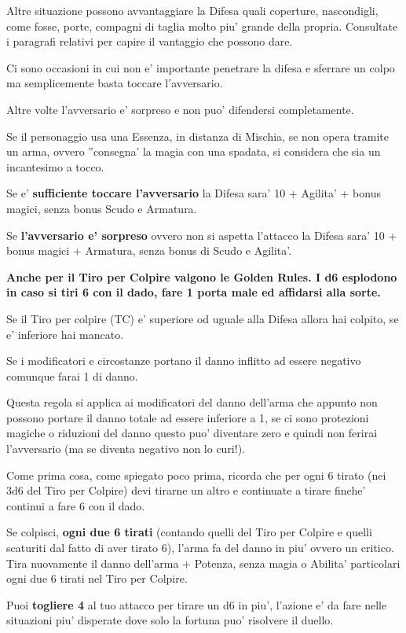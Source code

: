 \documentclass[a4paper,11pt,twoside,openany]{book}
\begin{document}
Altre situazione possono avvantaggiare la Difesa quali coperture, nascondigli, come fosse, porte, compagni di taglia molto piu' grande della propria. Consultate i paragrafi relativi per capire il vantaggio che possono dare.

Ci sono occasioni in cui non e' importante penetrare la difesa e sferrare un colpo ma semplicemente basta toccare l'avversario.

Altre volte l'avversario e' sorpreso e non puo' difendersi completamente.

Se il personaggio usa una Essenza, in distanza di Mischia, se non opera tramite un arma, ovvero ''consegna' la magia con una spadata, si considera che sia un incantesimo a tocco.

Se e' \textbf{sufficiente toccare l'avversario} la Difesa sara' 10 + Agilita' + bonus magici, senza bonus Scudo e Armatura.

Se \textbf{l'avversario e' sorpreso} ovvero non si aspetta l'attacco la Difesa sara' 10 + bonus magici + Armatura, senza bonus di Scudo e Agilita'.

\textbf{Anche per il Tiro per Colpire valgono le Golden Rules. I d6 esplodono in caso si tiri 6 con il dado, fare 1 porta male ed affidarsi alla sorte.}

Se il Tiro per colpire (TC) e' superiore od uguale alla Difesa allora hai colpito, se e' inferiore hai mancato.

Se i modificatori e circostanze portano il danno inflitto ad essere negativo comunque farai 1 di danno.

Questa regola si applica ai modificatori del danno dell'arma che appunto non possono portare il danno totale ad essere inferiore a 1, se ci sono protezioni magiche o riduzioni del danno questo puo' diventare zero e quindi non ferirai l'avversario (ma se diventa negativo non lo curi!).

Come prima cosa, come spiegato poco prima, ricorda che per ogni 6 tirato (nei 3d6 del Tiro per Colpire) devi tirarne un altro e continuate a tirare finche' continui a fare 6 con il dado.

Se colpisci, \textbf{ogni due 6 tirati} (contando quelli del Tiro per Colpire e quelli scaturiti dal fatto di aver tirato 6), l'arma fa del danno in piu' ovvero un critico. Tira nuovamente il danno dell'arma + Potenza, senza magia o Abilita' particolari ogni due 6 tirati nel Tiro per Colpire.

Puoi \textbf{togliere 4} al tuo attacco per tirare un d6 in piu', l'azione e' da fare nelle situazioni piu' disperate dove solo la fortuna puo' risolvere il duello.
\end{document}
